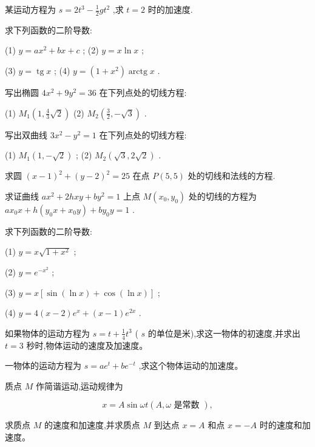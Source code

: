 \documentclass[lang=cn,newtx,12pt,scheme=chinese]{elegantbook}
\begin{document}
\begin{problemset}[练习]

\item 某运动方程为 \(s = 2{t}^{3} - \frac{1}{2}g{t}^{2}\) ,求 \(t = 2\) 时的加速度.

\item 求下列函数的二阶导数:

(1) \(y = a{x}^{2} + {bx} + c\) ; (2) \(y = x\ln x\) ;

(3) \(y = \operatorname{tg}x\) ; (4) \(y = \left( {1 + {x}^{2}}\right) \operatorname{arctg}x\) .

\end{problemset}

\begin{problemset}[习 题 七]

\item 写出椭圆 \(4{x}^{2} + 9{y}^{2} = {36}\) 在下列点处的切线方程:

(1) \({M}_{1}\left( {1,\frac{4}{3}\sqrt{2}}\right)\) (2) \({M}_{2}\left( {\frac{3}{2}, - \sqrt{3}}\right)\) .

\item 写出双曲线 \(3{x}^{2} - {y}^{2} = 1\) 在下列点处的切线方程:

(1) \({M}_{1}\left( {1, - \sqrt{2}}\right)\) ; (2) \({M}_{2}\left( {\sqrt{3},2\sqrt{2}}\right)\) .

\item 求圆 \({\left( x - 1\right) }^{2} + {\left( y - 2\right) }^{2} = {25}\) 在点 \(P\left( {5,5}\right)\) 处的切线和法线的方程.

\item 求证曲线 \(a{x}^{2} + {2hxy} + b{y}^{2} = 1\) 上点 \(M\left( {{x}_{0},{y}_{0}}\right)\) 处的切线的方程为 \(a{x}_{0}x + h\left( {{y}_{0}x + {x}_{0}y}\right) + b{y}_{0}y = 1\) .

\item 求下列函数的二阶导数:

(1) \(y = x\sqrt{1 + {x}^{2}}\) ;

(2) \(y = {e}^{-{x}^{2}}\) ;

(3) \(y = x\left\lbrack {\sin \left( {\ln x}\right) + \cos \left( {\ln x}\right) }\right\rbrack\) ;

(4) \(y = 4\left( {x - 2}\right) {e}^{x} + \left( {x - 1}\right) {e}^{2x}\) .

\item 如果物体的运动方程为 \(s = t + \frac{1}{4}{t}^{3}\) ( \(s\) 的单位是米),求这一物体的初速度,并求出 \(t = 3\) 秒时,物体运动的速度及加速度。

\item 一物体的运动方程为 \(s = a{e}^{t} + b{e}^{-t}\) ,求这个物体运动的加速度。

\item 质点 \(M\) 作简谐运动,运动规律为

\[
x = A\sin {\omega t}\left( {A,\omega \text{ 是常数 }}\right) ,
\]

求质点 \(M\) 的速度和加速度,并求质点 \(M\) 到达点 \(x = A\) 和点 \(x = - A\) 时的速度和加速度。

\end{problemset}
\end{document}

